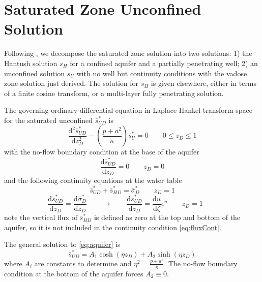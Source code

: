 \documentclass[12pt,letterpaper]{article}
\begin{document}
\section{Saturated Zone Unconfined Solution}
Following \cite{mishra10}, we decompose the saturated zone solution into two solutions: 1) the Hantush solution $s_H$ for a confined aquifer and a partially penetrating well; 2) an unconfined solution $s_U$ with no well but continuity conditions with the vadose zone solution just derived.  The solution for $s_H$ is given elsewhere, either in terms of a finite cosine transform, or a multi-layer fully penetrating solution.  

The governing ordinary differential equation in Laplace-Hankel
transform space for the saturated unconfined $\bar{s}^{\ast}_{UD}$ is
\begin{equation}
  \label{eq:aquifer}
  \frac{\mathrm{d}^2 \bar{s}_{UD}^{\ast}}{\mathrm{d} z_D^2} - \left( \frac{p + a^2}{\kappa} \right)\bar{s}_U^{\ast} = 0 \qquad 0 \le z_D \le 1
\end{equation}
with the no-flow boundary condition at the base of the aquifer
\begin{equation}\nonumber
 \frac{\mathrm{d} \bar{s}_{UD}^{\ast}}{\mathrm{d} z_D} = 0 \qquad z_D=0 
\end{equation}
and the following continuity equations at the water table
\begin{equation}
  \label{eq:headCont}
  \bar{s}_{UD}^{\ast} + \bar{s}_{HD}^{\ast} = \bar{\sigma}_D^{\ast} \qquad z_D=1
\end{equation}
\begin{equation}
  \label{eq:fluxCont}
  \frac{\mathrm{d} \bar{s}_{UD}^{\ast}}{\mathrm{d} z_D}  = \frac{\mathrm{d}
    \bar{\sigma}_D^{\ast}}{\mathrm{d} z_D} \qquad \rightarrow \qquad \frac{\mathrm{d} \bar{s}_{UD}^{\ast}}{\mathrm{d} z_D}  = \frac{\mathrm{d}u}{\mathrm{d} \zeta} e^u \qquad z_D=1
  \qquad 
\end{equation}
note the vertical flux of $\bar{s}_{HD}^{\ast}$ is defined as zero at
the top and bottom of the aquifer, so it is not included in the
continuity condition \eqref{eq:fluxCont}.

The general solution to \eqref{eq:aquifer} is 
\begin{equation}
  \label{eq:su}
  \bar{s}_{UD}^{\ast} = A_1 \cosh(\eta z_D) + A_2 \sinh(\eta z_D)
\end{equation}
where $A_i$ are constants to determine and $\eta^2 = \frac{p + a^2}{\kappa}$.  The no-flow boundary condition at the bottom of the aquifer forces $A_2\equiv 0$.  
\end{document}

